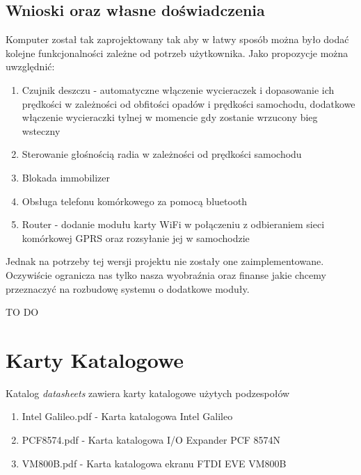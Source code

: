 \documentclass{xmgr}
\begin{document}
\section{Wnioski oraz własne doświadczenia}
Komputer został tak zaprojektowany tak aby w łatwy sposób można było dodać kolejne funkcjonalności zależne od potrzeb użytkownika. Jako propozycje można uwzględnić:
\begin{enumerate}
	\item Czujnik deszczu - automatyczne włączenie wycieraczek i dopasowanie ich prędkości w zależności od obfitości opadów i prędkości samochodu, dodatkowe włączenie wycieraczki tylnej w momencie gdy zostanie wrzucony bieg wsteczny
	\item Sterowanie głośnością radia w zależności od prędkości samochodu
	\item Blokada immobilizer
	\item Obsługa telefonu komórkowego za pomocą bluetooth
	\item Router - dodanie modułu karty WiFi w połączeniu z odbieraniem sieci komórkowej GPRS oraz rozsyłanie jej w samochodzie
\end{enumerate}
Jednak na potrzeby tej wersji projektu nie zostały one zaimplementowane. Oczywiście ogranicza nas tylko nasza wyobraźnia oraz finanse jakie chcemy przeznaczyć na rozbudowę systemu o dodatkowe moduły. 



\summary
TO DO


\appendix
\chapter{Karty Katalogowe}
Katalog \emph{datasheets} zawiera karty katalogowe użytych podzespołów
\begin{enumerate} 
\item Intel Galileo.pdf - Karta katalogowa Intel Galileo
\item PCF8574.pdf - Karta katalogowa I/O Expander PCF 8574N
\item VM800B.pdf - Karta katalogowa ekranu FTDI EVE VM800B
\end{enumerate}
\end{document}
